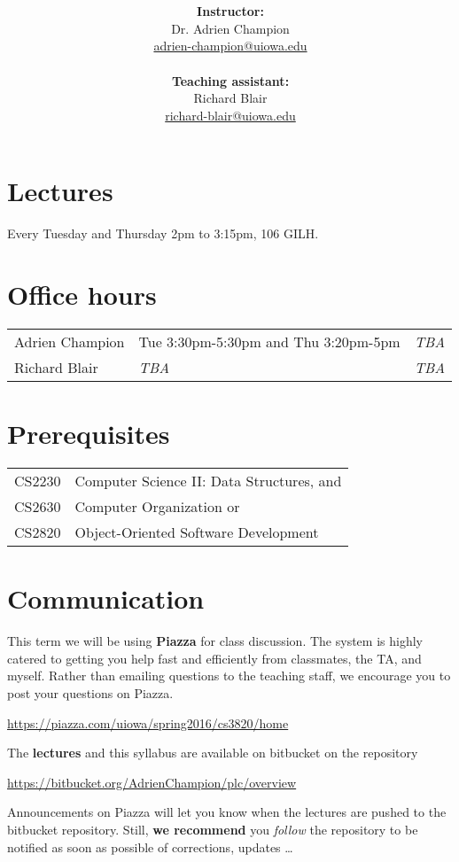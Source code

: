 \documentclass[10pt]{article}
\title{
  \articleTitle
}
\author{
  \begin{minipage}{.5\textwidth}
    \centering
    \textbf{Instructor:}\\
    Dr. Adrien Champion\\
    \href{mailto:adrien-champion@uiowa.edu}{adrien-champion@uiowa.edu}\\[2pt]
  \end{minipage}
  \begin{minipage}{.5\textwidth}
    \centering
    \textbf{Teaching assistant:}\\
    Richard Blair\\
    \href{mailto:richard-blair@uiowa.edu}{richard-blair@uiowa.edu}
  \end{minipage}
}
\date{}
\newcommand{\ita}[1]{\textit{#1}}
\newcommand{\tba}{\ita{TBA}\xspace}
\begin{document}
\maketitle

\section*{Lectures}
Every Tuesday and Thursday 2pm to 3:15pm, 106 GILH.


\section*{Office hours}
\begin{tabular}{l | l l}
  Adrien Champion & Tue 3:30pm-5:30pm and Thu 3:20pm-5pm & \tba \\
  Richard Blair & \tba & \tba \\
\end{tabular}


\section*{Prerequisites}
\begin{tabular}{l l}
  CS$2230$ & Computer Science II: Data Structures, and \\
  CS$2630$ & Computer Organization or \\
  CS$2820$ & Object-Oriented Software Development
\end{tabular}


\section*{Communication}

This term we will be using \textbf{Piazza} for class discussion. The system is
highly catered to getting you help fast and efficiently from classmates, the
TA, and myself. Rather than emailing questions to the teaching staff, we
encourage you to post your questions on Piazza.

\centerline{
  \url{https://piazza.com/uiowa/spring2016/cs3820/home}
}

\noindent
The \textbf{lectures} and this syllabus are available on bitbucket on the
repository

\centerline{
  \url{https://bitbucket.org/AdrienChampion/plc/overview}
}

\noindent
Announcements on Piazza will let you know when the lectures are pushed to the
bitbucket repository. Still, \textbf{we recommend} you \ita{follow} the
repository to be notified as soon as possible of corrections, updates \ldots
\end{document}
